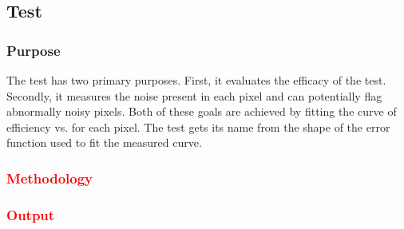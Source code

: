 
\subsection{\scurves Test}
\label{ss:scurves}

\subsubsection{Purpose}

The \scurves test has two primary purposes.
First, it evaluates the efficacy of the \trimming test.
Secondly, it measures the noise present in each pixel and can potentially flag abnormally noisy pixels.
Both of these goals are achieved by fitting the curve of efficiency vs. \vcal for each pixel.
The test gets its name from the shape of the error function used to fit the measured curve.

\subsubsection{\textcolor{red}{Methodology}}


\subsubsection{\textcolor{red}{Output}}

